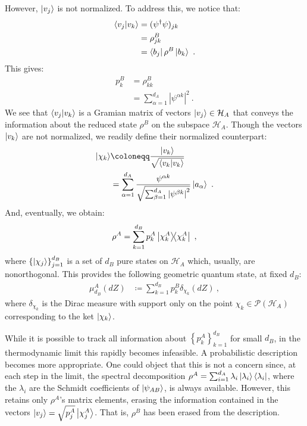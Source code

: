 \documentclass[draft,nofootinbib,pre,twocolumn,showpacs,showkeys,groupaddress,preprintnumbers,floatfix]{revtex4-1}
\newcommand{\1}{\mathbbm{1}}
\begin{document}
However, $\ket{v_j}$ is not normalized. To address this, we notice that:
\begin{align*}
\braket{v_j}{v_k} & = (\psi^\dagger \psi)_{jk} \\
  & = \rho^B_{jk} \\
  & = \bra{b_j} \rho^B \ket{b_k}
  ~.
\end{align*}
This gives:
\begin{align*}
p_k^B & = \rho^B_{kk} \\
  & = \sum_{\alpha=1}^{d_A} \left\vert \psi^{\alpha k} \right\vert^2 
  ~.
\end{align*}
We see that $\braket{v_j}{v_k}$ is a Gramian matrix of vectors $\ket{v_j} \in
\mathcal{H}_A$ that conveys the information about the reduced state $\rho^B$
on the subspace $\mathcal{H}_A$. Though the vectors
$\ket{v_k}$ are not normalized, we readily define their normalized counterpart:
\begin{align*}
\ket{\chi_k} & \coloneqq \frac{\ket{v_k}}{\sqrt{\braket{v_k}{v_k}}} \\
  & = \sum_{\alpha=1}^{d_A} \frac{\psi^{\alpha k}}{\sqrt{\sum_{\beta=1}^{d_A} \left\vert \psi^{\beta k} \right\vert^2 }} \ket{a_\alpha}
  ~.
\end{align*}
And, eventually, we obtain:
\begin{align}
\rho^A = \sum_{k=1}^{d_B} p_k^A \ketbra{\chi_k^A}{\chi_k^A}
  ~,
\label{eq:PartialA}
\end{align}
where $\left\{\ket{\chi_j}\right\}_{j=1}^{d_B}$ is a set
of $d_B$ pure states on $\mathcal{H}_A$ which, usually,
are nonorthogonal. This provides the following geometric quantum 
state, at fixed $d_B$:
\begin{align*}
  \mu^{A}_{d_B}(dZ)
  & \coloneqq  \sum_{k=1}^{d_B} p_k^B \delta_{\chi_k}  \left(dZ\right)
  ~,
\end{align*}
where $\delta_{\chi_k}$ is the Dirac measure with support only on
the point $\chi_k \in \mathcal{P}(\mathcal{H}_A)$ corresponding to the ket $\ket{\chi_k}$.

While it is possible to track all information about
$\left\{p_k^A\right\}_{k=1}^{d_B}$ for small $d_B$, in the thermodynamic limit
this rapidly becomes infeasible. A probabilistic description becomes more
appropriate. One could object that this is not a concern since, at each step in
the limit, the spectral decomposition $\rho^A = \sum_{i=1}^{d_A} \lambda_i
\ket{\lambda_i}\bra{\lambda_i}$, where the $\lambda_i$ are the Schmidt
coefficients of $\ket{\psi_{AB}}$, is always available. However, this retains
only $\rho^A$'s matrix elements, erasing the information contained in the
vectors $\ket{v_j} = \sqrt{p^A_j} \ket{\chi^A_j}$. That is, $\rho^B$ has been
erased from the description.
\end{document}
